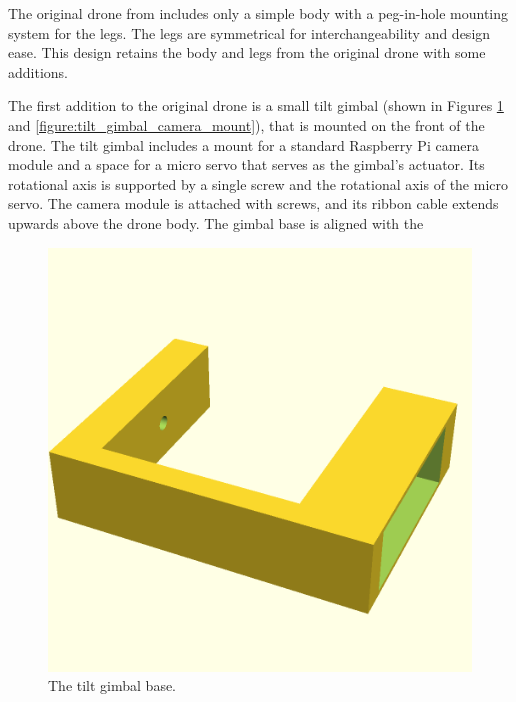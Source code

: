 The original drone from \cite{thingiverse_rpi_drone} includes only a simple body with a peg-in-hole mounting system
for the legs.
The legs are symmetrical for interchangeability and design ease.
This design retains the body and legs from the original drone with some additions.

The first addition to the original drone is a small tilt gimbal
(shown in Figures \ref{figure:tilt_gimbal_base} and \ref{figure:tilt_gimbal_camera_mount}),
that is mounted on the front of the drone.
The tilt gimbal includes a mount for a standard Raspberry Pi camera module and a space for a micro servo that serves
as the gimbal's actuator.
Its rotational axis is supported by a single screw and the rotational axis of the micro servo.
The camera module is attached with screws, and its ribbon cable extends upwards above the drone body.
The gimbal base is aligned with the

\begin{figure}
    \centering
    \includegraphics[width=0.75\columnwidth]{images/gimbal_base.png}
    \caption{The tilt gimbal base.}
    \label{figure:tilt_gimbal_base}
\end{figure}

